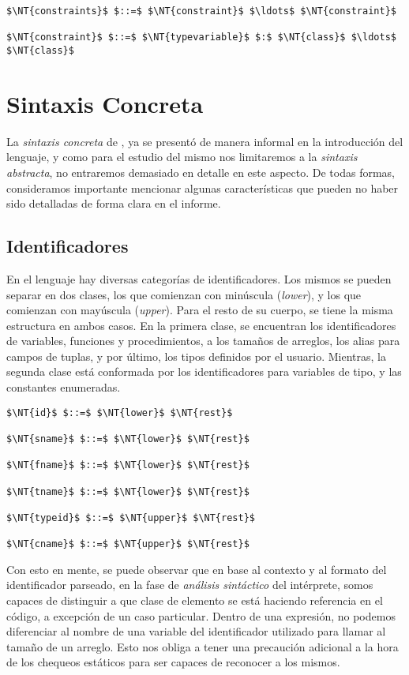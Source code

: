 \begin{lstlisting}[style = syntax]
$\NT{constraints}$ $::=$ $\NT{constraint}$ $\ldots$ $\NT{constraint}$

$\NT{constraint}$ $::=$ $\NT{typevariable}$ $:$ $\NT{class}$ $\ldots$ $\NT{class}$
\end{lstlisting}

\section{Sintaxis Concreta}

La \textit{sintaxis concreta} de \Lenguaje{}, ya se presentó de manera informal en la introducción del lenguaje, y como para el estudio del mismo nos limitaremos a la \textit{sintaxis abstracta}, no entraremos demasiado en detalle en este aspecto.
De todas formas, consideramos importante mencionar algunas características que pueden no haber sido detalladas de forma clara en el informe.

\subsection{Identificadores}

En el lenguaje hay diversas categorías de identificadores.
Los mismos se pueden separar en dos clases, los que comienzan con minúscula (\textit{lower}), y los que comienzan con mayúscula (\textit{upper}).
Para el resto de su cuerpo, se tiene la misma estructura en ambos casos.
En la primera clase, se encuentran los identificadores de variables, funciones y procedimientos, a los tamaños de arreglos, los alias para campos de tuplas, y por último, los tipos definidos por el usuario.
Mientras, la segunda clase está conformada por los identificadores para variables de tipo, y las constantes enumeradas.

\begin{lstlisting}[style = syntax]
$\NT{id}$ $::=$ $\NT{lower}$ $\NT{rest}$

$\NT{sname}$ $::=$ $\NT{lower}$ $\NT{rest}$

$\NT{fname}$ $::=$ $\NT{lower}$ $\NT{rest}$

$\NT{tname}$ $::=$ $\NT{lower}$ $\NT{rest}$

$\NT{typeid}$ $::=$ $\NT{upper}$ $\NT{rest}$

$\NT{cname}$ $::=$ $\NT{upper}$ $\NT{rest}$
\end{lstlisting}

Con esto en mente, se puede observar que en base al contexto y al formato del identificador parseado, en la fase de \textit{análisis sintáctico} del intérprete, somos capaces de distinguir a que clase de elemento se está haciendo referencia en el código, a excepción de un caso particular.
Dentro de una expresión, no podemos diferenciar al nombre de una variable del identificador utilizado para llamar al tamaño de un arreglo.
Esto nos obliga a tener una precaución adicional a la hora de los chequeos estáticos para ser capaces de reconocer a los mismos.

